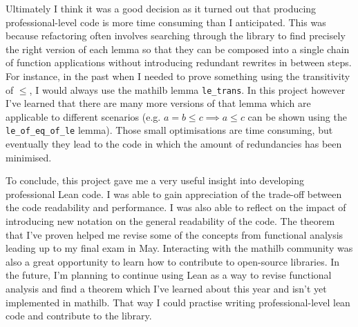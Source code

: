 \documentclass[11pt]{article}
\begin{document}
Ultimately I think it was a good decision as it turned out
that producing professional-level code is more time consuming than I anticipated.
This was because refactoring often involves searching through the library to find
precisely the right version of each lemma so that they can be composed into a
single chain of function applications without introducing redundant rewrites in
between steps. For instance, in the past when I needed to prove something using
the transitivity of $\le$, I would always use the mathilb lemma \texttt{le\_trans}.
In this project however I've learned that there are many more versions of that
lemma which are applicable to different scenarios (e.g. $a = b \le c \implies a \le c$
can be shown using the \texttt{le\_of\_eq\_of\_le} lemma). Those small optimisations
are time consuming, but eventually they lead to the code in which the amount of
redundancies has been minimised.

To conclude, this project gave me a very useful insight into developing professional
Lean code. I was able to gain appreciation of the trade-off between the code
readability and performance. I was also able to reflect on the impact of introducing
new notation on the general readability of the code. The theorem that I've proven helped me revise some
of the concepts from functional analysis leading up to my final exam in May.
Interacting with the mathilb community was also a great
opportunity to learn how to contribute to open-source libraries. In the future,
I'm planning to continue using Lean as a way to revise functional analysis and
find a theorem which I've learned about this year and isn't yet implemented
in mathilb. That way I could practise writing professional-level lean code and
contribute to the library.
\end{document}
